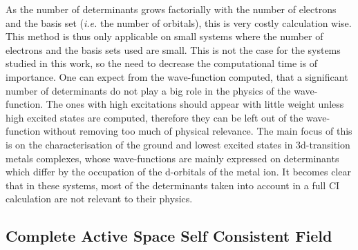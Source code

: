 \documentclass[12pt,a4paper]{report}
\numberwithin{equation}{section}
\begin{document}
As the number of determinants grows factorially with the number of electrons and the basis set (\textit{i.e.} the number of orbitals), this is very costly calculation wise.
This method is thus only applicable on small systems where the number of electrons and the basis sets used are small.
This is not the case for the systems studied in this work, so the need to decrease the computational time is of importance.
One can expect from the wave-function computed, that a significant number of determinants do not play a big role in the physics of the wave-function.
The ones with high excitations should appear with little weight unless high excited states are computed, therefore they can be left out of the wave-function without removing too much of physical relevance. 
The main focus of this is on the characterisation of the ground and lowest excited states in 3d-transition metals complexes, whose wave-functions are mainly expressed on determinants which differ by the occupation of the d-orbitals of the metal ion.
It becomes clear that in these systems, most of the determinants taken into account in a full CI calculation are not relevant to their physics.



\subsection{Complete Active Space Self Consistent Field}
\end{document}
